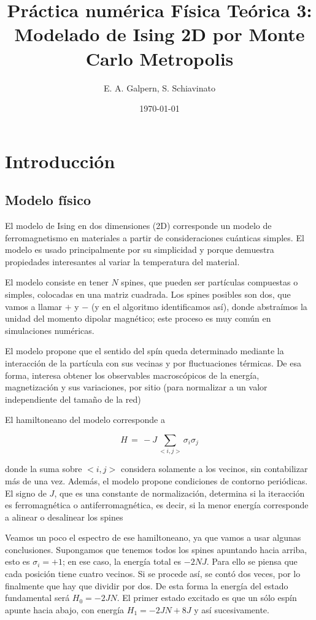 \documentclass[12pt,a4paper]{article}
\title{Práctica numérica Física Teórica 3: \\ Modelado de Ising 2D por Monte Carlo Metropolis}
\author{E. A. Galpern, S. Schiavinato}
\date{\today}
\begin{document}
\maketitle



\section{Introducción}

\subsection{Modelo físico}
El modelo de Ising en dos dimensiones (2D) corresponde un modelo de ferromagnetismo en materiales a partir de consideraciones cuánticas simples. El modelo es usado principalmente por su simplicidad y porque demuestra propiedades interesantes al variar la temperatura del material. 

El modelo consiste en tener $N$ spines, que pueden ser partículas compuestas o simples, colocadas en una matriz cuadrada. Los spines posibles son dos, que vamos a llamar $+$ y $-$ (y en el algoritmo identificamos así), donde abstraímos la unidad del momento dipolar magnético; este proceso es muy común en simulaciones numéricas. 

El modelo propone que el sentido del spín queda determinado mediante la interacción de la partícula con sus vecinas y por fluctuaciones térmicas. De esa forma,  interesa obtener los observables macroscópicos de la energía, magnetización y sus variaciones, por sitio (para normalizar a un valor independiente del tamaño de la red) 

El hamiltoneano del modelo corresponde a 

\begin{equation}
    H\,=\,-J\sum_{<i,j>}\sigma_i\sigma_j
\end{equation}

donde la suma sobre $<i,j>$ considera solamente a los vecinos, sin contabilizar más de una vez. Además, el modelo propone condiciones de contorno periódicas. El signo de $J$, que es una constante de normalización, determina si la iteracción es ferromagnética o antiferromagnética, es decir, si la menor energía corresponde a alinear o desalinear los spines

Veamos un poco el espectro de ese hamiltoneano, ya que vamos a usar algunas conclusiones. Supongamos que tenemos todos los spines apuntando hacia arriba, esto es $\sigma_i = +1$; en ese caso, la energía total es $-2 N J$. Para ello se piensa que cada posición tiene cuatro vecinos. Si se procede así, se contó dos veces, por lo finalmente que hay que dividir por dos. De esta forma la energía del estado fundamental será $H_0=-2JN$. El primer estado excitado es que un sólo espín apunte hacia abajo, con energía $H_1=-2JN + 8J$ y así sucesivamente. 
\end{document}

